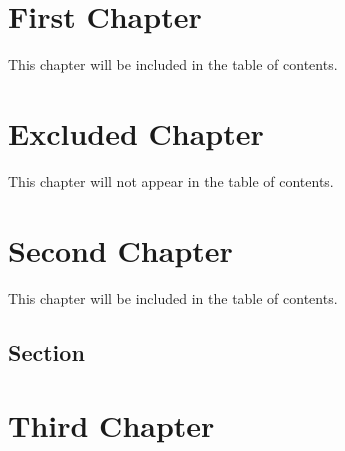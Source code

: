 \documentclass{scrbook}
\begin{document}
\tableofcontents

\chapter{First Chapter}
This chapter will be included in the table of contents.

\chapter*{Excluded Chapter}
This chapter will not appear in the table of contents.

\chapter{Second Chapter}
This chapter will be included in the table of contents.
\section{Section}


\chapter{Third Chapter}
\end{document}
